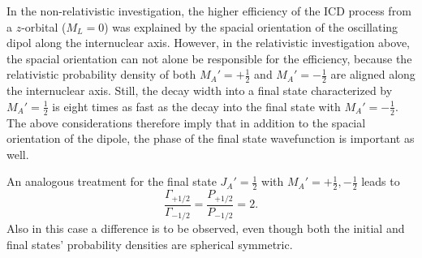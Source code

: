 In the non-relativistic investigation, the higher efficiency of the \ac{ICD} process
from a $z$-orbital ($M_L=0$) was explained by the spacial orientation of the
oscillating dipol along the internuclear axis.
However, in the relativistic investigation above, the spacial orientation
can not alone be responsible for the efficiency, because the relativistic
probability density of both $M_A'= +\frac 12$ and $M_A'= -\frac 12$ are aligned
along the internuclear axis. Still, the decay width into a final state characterized
by $M_A'= \frac 12$ is eight times as fast as the decay into the final state
with $M_A'= -\frac 12$. The above considerations therefore imply
that in addition to the spacial
orientation of the dipole, the phase of the final state wavefunction is
important as well.

An analogous treatment for the final state
$J_A'=\frac 12$ with $M_A'= +\frac 12, -\frac 12$
leads to
\begin{equation}
  \frac{\Gamma_{+1/2}}{\Gamma_{-1/2}} = \frac{P_{+1/2}}{P_{-1/2}} = 2  .
\end{equation}
Also in this case a difference is to be observed, even though both the initial
and final states' probability densities are spherical symmetric.

